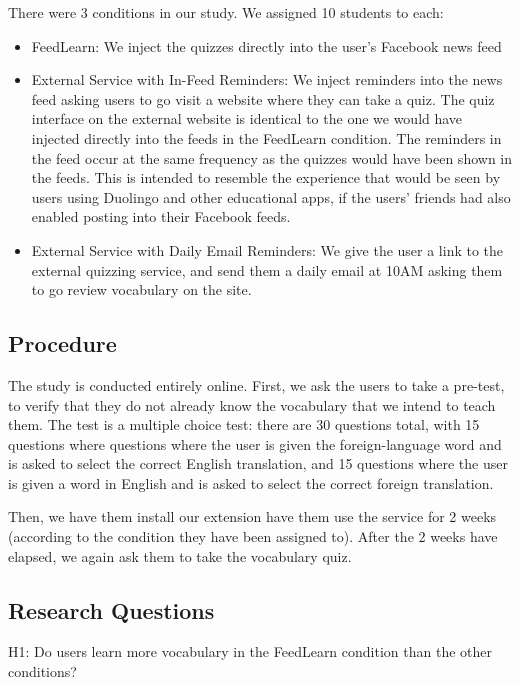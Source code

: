 \documentclass{sigchi}
\begin{document}
There were 3 conditions in our study. We assigned 10 students to each:

\begin{itemize}
\item FeedLearn: We inject the quizzes directly into the user's Facebook news feed
\item External Service with In-Feed Reminders: We inject reminders into the news feed asking users to go visit a website where they can take a quiz. The quiz interface on the external website is identical to the one we would have injected directly into the feeds in the FeedLearn condition. The reminders in the feed occur at the same frequency as the quizzes would have been shown in the feeds. This is intended to resemble the experience that would be seen by users using Duolingo and other educational apps, if the users' friends had also enabled posting into their Facebook feeds.
\item External Service with Daily Email Reminders: We give the user a link to the external quizzing service, and send them a daily email at 10AM asking them to go review vocabulary on the site.
\end{itemize}

\subsection{Procedure}

The study is conducted entirely online. First, we ask the users to take a pre-test, to verify that they do not already know the vocabulary that we intend to teach them. The test is a multiple choice test: there are 30 questions total, with 15 questions where questions where the user is given the foreign-language word and is asked to select the correct English translation, and 15 questions where the user is given a word in English and is asked to select the correct foreign translation.

Then, we have them install our extension have them use the service for 2 weeks (according to the condition they have been assigned to). After the 2 weeks have elapsed, we again ask them to take the vocabulary quiz.

\subsection{Research Questions}

H1: Do users learn more vocabulary in the FeedLearn condition than the other conditions?
\end{document}
